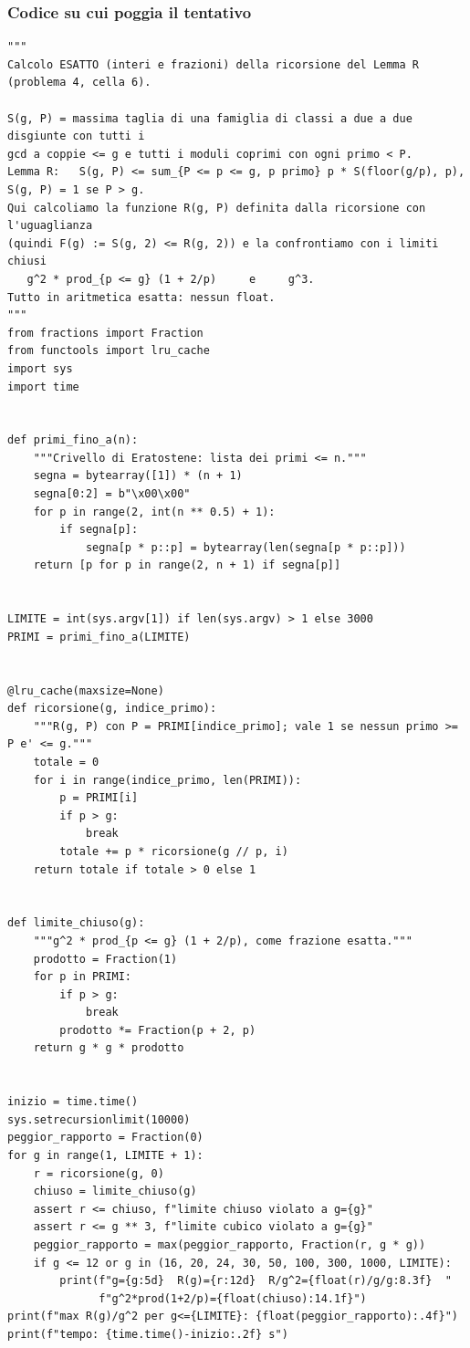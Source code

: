 \documentclass[11pt,a4paper]{article}
\begin{document}
\subsubsection{Codice su cui poggia il tentativo}
\begin{lstlisting}[caption={attempt\_001 code\_1 [python, rigore exact] — Exact integer evaluation of the recursion R(g,P) of Lemma 4 for all g \textless{}= 3000 (P ranging o — verdetto del Referee: REJECT}]
"""
Calcolo ESATTO (interi e frazioni) della ricorsione del Lemma R (problema 4, cella 6).

S(g, P) = massima taglia di una famiglia di classi a due a due disgiunte con tutti i
gcd a coppie <= g e tutti i moduli coprimi con ogni primo < P.
Lemma R:   S(g, P) <= sum_{P <= p <= g, p primo} p * S(floor(g/p), p),   S(g, P) = 1 se P > g.
Qui calcoliamo la funzione R(g, P) definita dalla ricorsione con l'uguaglianza
(quindi F(g) := S(g, 2) <= R(g, 2)) e la confrontiamo con i limiti chiusi
   g^2 * prod_{p <= g} (1 + 2/p)     e     g^3.
Tutto in aritmetica esatta: nessun float.
"""
from fractions import Fraction
from functools import lru_cache
import sys
import time


def primi_fino_a(n):
    """Crivello di Eratostene: lista dei primi <= n."""
    segna = bytearray([1]) * (n + 1)
    segna[0:2] = b"\x00\x00"
    for p in range(2, int(n ** 0.5) + 1):
        if segna[p]:
            segna[p * p::p] = bytearray(len(segna[p * p::p]))
    return [p for p in range(2, n + 1) if segna[p]]


LIMITE = int(sys.argv[1]) if len(sys.argv) > 1 else 3000
PRIMI = primi_fino_a(LIMITE)


@lru_cache(maxsize=None)
def ricorsione(g, indice_primo):
    """R(g, P) con P = PRIMI[indice_primo]; vale 1 se nessun primo >= P e' <= g."""
    totale = 0
    for i in range(indice_primo, len(PRIMI)):
        p = PRIMI[i]
        if p > g:
            break
        totale += p * ricorsione(g // p, i)
    return totale if totale > 0 else 1


def limite_chiuso(g):
    """g^2 * prod_{p <= g} (1 + 2/p), come frazione esatta."""
    prodotto = Fraction(1)
    for p in PRIMI:
        if p > g:
            break
        prodotto *= Fraction(p + 2, p)
    return g * g * prodotto


inizio = time.time()
sys.setrecursionlimit(10000)
peggior_rapporto = Fraction(0)
for g in range(1, LIMITE + 1):
    r = ricorsione(g, 0)
    chiuso = limite_chiuso(g)
    assert r <= chiuso, f"limite chiuso violato a g={g}"
    assert r <= g ** 3, f"limite cubico violato a g={g}"
    peggior_rapporto = max(peggior_rapporto, Fraction(r, g * g))
    if g <= 12 or g in (16, 20, 24, 30, 50, 100, 300, 1000, LIMITE):
        print(f"g={g:5d}  R(g)={r:12d}  R/g^2={float(r)/g/g:8.3f}  "
              f"g^2*prod(1+2/p)={float(chiuso):14.1f}")
print(f"max R(g)/g^2 per g<={LIMITE}: {float(peggior_rapporto):.4f}")
print(f"tempo: {time.time()-inizio:.2f} s")

\end{lstlisting}
\end{document}
